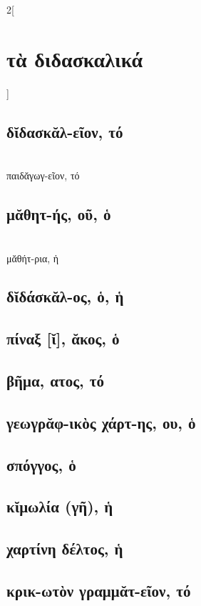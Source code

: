 \documentclass{book}
\begin{document}
\newpage
\begin{multicols}{2}[\section{τὰ διδασκαλικά}] 
\subsection{δῐδασκᾰλ-εῖον, τό}  ~\\
παιδᾰγωγ-εῖον, τό
\subsection{μᾰθητ-ής, οῦ, ὁ}  ~\\
μᾰθήτ-ρια, ἡ 
\subsection{δῐδάσκᾰλ-ος, ὁ, ἡ}
\subsection{πίναξ [ῐ], ᾰκος, ὁ}
\subsection{βῆμα, ατος, τό}
\subsection{γεωγρᾰφ-ικὸς χάρτ-ης, ου, ὁ}
\subsection{σπόγγος, ὁ}
\subsection{κῐμωλία (γῆ), ἡ}
\subsection{χαρτίνη δέλτος, ἡ}
\subsection{κρικ-ωτὸν γραμμᾰτ-εῖον, τό}

\end{multicols}
\end{document}
